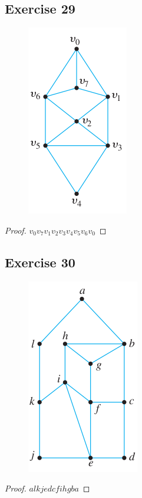\documentclass[14pt]{extarticle}
\begin{document}
\subsection{Exercise 29}
\begin{figure}[ht!]
\centering
\includegraphics[scale=0.7]{../images/10.1.29.png}
\end{figure}

\begin{proof}
\(v_0 v_7 v_1 v_2 v_3 v_4 v_5 v_6 v_0\)
\end{proof}

\subsection{Exercise 30}
\begin{figure}[ht!]
\centering
\includegraphics[scale=0.5]{../images/10.1.30.png}
\end{figure}

\begin{proof}
\(alkjedcfihgba\)
\end{proof}
\end{document}
